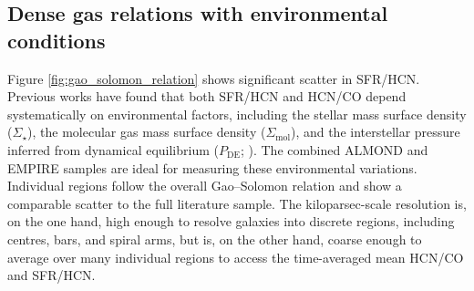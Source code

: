 \documentclass[letter, longauth]{aa} %
\newcommand*{\sigmol}{\ensuremath{\Sigma_{\text{mol}}}\xspace}  %
\newcommand*{\pde}{\ensuremath{P_{\text{DE}}}\xspace}  %
\newcommand*{\sigstar}{\ensuremath{\Sigma_{\star}}\xspace}  %
\begin{document}
\subsection{Dense gas relations with environmental conditions}
\label{sec:environment_relations}

Figure \ref{fig:gao_solomon_relation} shows significant scatter in SFR/HCN. Previous works have found that both SFR/HCN and HCN/CO depend systematically on environmental factors, including the stellar mass surface density (\sigstar), the molecular gas mass surface density (\sigmol), and the interstellar pressure inferred from dynamical equilibrium (\pde; \citealt{Usero2015, Gallagher2018a, Jimenez-Donaire2019}). The combined ALMOND and EMPIRE samples are ideal for measuring these environmental variations. 
Individual regions follow the overall Gao--Solomon relation and show a comparable scatter to the full literature sample. The kiloparsec-scale resolution is, on the one hand, high enough to resolve galaxies into discrete regions, including centres, bars, and spiral arms, but is, on the other hand, coarse enough to average over many individual regions to access the time-averaged mean HCN/CO and SFR/HCN.
\end{document}
